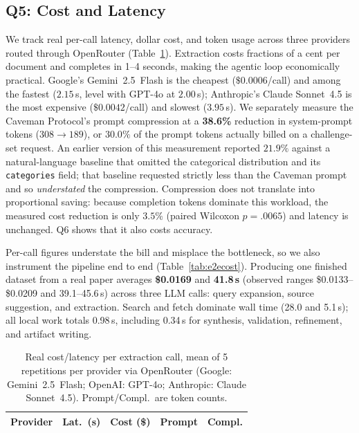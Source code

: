 \documentclass[letterpaper]{article} %
\begin{document}
\subsection{Q5: Cost and Latency}
We track real per-call latency, dollar cost, and token usage across three
providers routed through OpenRouter (Table~\ref{tab:cost}). Extraction costs
fractions of a cent per document and completes in 1--4 seconds, making the
agentic loop economically practical. Google's Gemini~2.5~Flash is the cheapest ($\$0.0006$/call) and among the fastest
($2.15$\,s, level with GPT-4o at $2.00$\,s); Anthropic's Claude Sonnet~4.5 is the
most expensive ($\$0.0042$/call) and slowest ($3.95$\,s). We separately measure
the Caveman Protocol's prompt compression at a \textbf{38.6\%} reduction in
system-prompt tokens ($308 \rightarrow 189$), or $30.0\%$ of the prompt tokens
actually billed on a challenge-set request. An earlier version of this
measurement reported $21.9\%$ against a natural-language baseline that omitted
the categorical distribution and its \texttt{categories} field; that baseline
requested strictly less than the Caveman prompt and so \emph{understated} the
compression. Compression does not translate into proportional saving: because
completion tokens dominate this workload, the measured cost reduction is only
$3.5\%$ (paired Wilcoxon $p=.0065$) and latency is unchanged. Q6 shows that it
also costs accuracy.

Per-call figures understate the bill and misplace the bottleneck, so we also
instrument the pipeline end to end (Table~\ref{tab:e2ecost}). Producing one
finished dataset from a real paper averages \textbf{\$0.0169} and
\textbf{41.8\,s} (observed ranges \$0.0133--\$0.0209 and 39.1--45.6\,s) across
three LLM calls: query expansion, source suggestion, and extraction. Search and
fetch dominate wall time (28.0 and 5.1\,s); all local work totals 0.98\,s,
including 0.34\,s for synthesis, validation, refinement, and artifact writing.

\begin{table}[t]
\centering
\setlength{\tabcolsep}{4pt}
\begin{tabular}{lrrrr}
\toprule
Provider & Lat.\ (s) & Cost (\$) & Prompt & Compl. \\
\midrule
%
\end{tabular}
\caption{Real cost/latency per extraction call, mean of 5 repetitions per
provider via OpenRouter (Google: Gemini~2.5~Flash; OpenAI: GPT-4o; Anthropic:
Claude Sonnet~4.5). Prompt/Compl.\ are token counts.}
\label{tab:cost}
\end{table}
\end{document}
